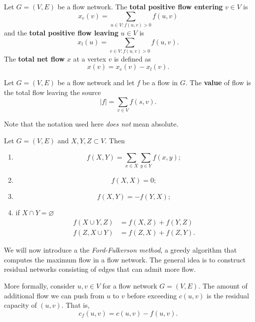 \begin{definition}[]
    Let $G = (V, E)$ be a flow network.
    The \textbf{total positive flow entering} $v \in V$ is
    \[ 
        x_e(v) = \sum_{u \in V: f(u,v) > 0} f(u,v) 
    \]
    and the \textbf{total positive flow leaving} $u \in V$ is
    \[ 
        x_l(u) = \sum_{v \in V: f(u,v) > 0} f(u,v). 
    \]
    The \textbf{total net flow} $x$ at a vertex $v$ is defined as
    \[ 
        x(v) = x_e(v) - x_l(v). 
    \]
\end{definition}

\begin{definition}
    Let $G = (V, E)$ be a flow network and let $f$ be a flow in $G$.
    The \textbf{value} of flow is the total flow leaving the source
    \[
        \lvert f \rvert = \sum_{v \in V} f(s, v).
    \]
\end{definition}

Note that the notation used here \emph{does not} mean absolute.

\begin{proposition}
    Let $G  = (V, E)$ and $X, Y, Z \subset V$.
    Then
    \begin{enumerate}
        \item
            \[
                f(X, Y) = \sum_{x \in X} \sum_{y \in Y} f(x, y);
            \]
            
        \item
            \[
                f(X, X) = 0;
            \]
            
        \item
            \[
                f(X, Y) = -f(Y, X);
            \]
            
        \item if $X \cap Y = \varnothing$
            \begin{align*}
                f(X \cup Y, Z) &= f(X, Z) + f(Y, Z) \\
                f(Z, X \cup Y) &= f(Z, X) + f(Z, Y).
            \end{align*}
    \end{enumerate}
\end{proposition}

We will now introduce a the \emph{Ford-Fulkerson method},
a greedy algorithm that computes the maximum flow in a flow network.
The general idea is to construct residual networks consisting
of edges that can admit more flow.

More formally, consider $u, v \in V$ for a flow network $G = (V, E)$.
The amount of additional flow we can push from $u$ to $v$ before
exceeding $c(u, v)$ is the residual capacity of $(u, v)$. That is,
\[
    c_f(u,v) = c(u,v) - f(u,v).
\]

